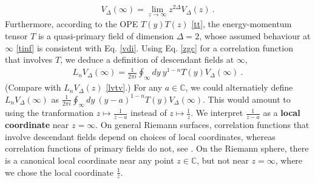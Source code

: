 \documentclass[12pt, a4paper]{article}
\newcommand{\myindex}[1]{\textbf{\boldmath #1}}
\begin{document}
\begin{align}
 V_\Delta(\infty) = \lim_{z\to\infty} z^{2\Delta}V_\Delta(z)\ . 
 \label{vdi}
\end{align}
Furthermore, 
according to the OPE $T(y)T(z)$ \eqref{tt}, the energy-momentum tensor $T$ is a quasi-primary field of dimension $\Delta=2$, whose assumed behaviour at $\infty$ \eqref{tinf} is consistent with Eq. \eqref{vdi}. 
Using Eq. \eqref{zgc} for a correlation function that involves $T$, we deduce a definition of descendant fields at $\infty$, 
\begin{align}
 L_n V_\Delta(\infty) = \frac{1}{2\pi i} \oint_\infty dy\ y^{1-n} T(y)V_\Delta(\infty)\ .
 \label{lnia}
\end{align}
(Compare with $L_nV_\Delta(z)$ \eqref{lvtv}.) 
For any $a\in\mathbb{C}$, we could alternatiely define $L_n V_\Delta(\infty)$ as $\frac{1}{2\pi i} \oint_\infty dy\ (y-a)^{1-n} T(y)V_\Delta(\infty)$. This would amount to using the tranformation $z\mapsto \frac{1}{z-a}$ instead of $z\mapsto \frac{1}{z}$.
We interpret $\frac{1}{z-a}$ as a \myindex{local coordinate} near $z=\infty$. On general Riemann surfaces, correlation functions that involve descendant fields depend on choices of local coordinates, whereas correlation functions of primary fields do not, see \cite[Section 3]{br24}. On the Riemann sphere, there is
a canonical local coordinate near any point $z\in\mathbb{C}$, but not near $z=\infty$, where we chose the local coordinate $\frac{1}{z}$.
\end{document}
